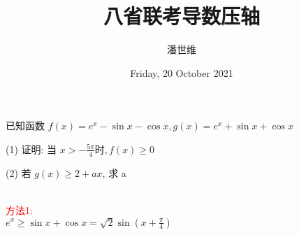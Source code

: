 \documentclass[a4paper,12pt]{article}
\begin{document}
\title {八省联考导数压轴}
\author{潘世维}
\date{Friday, 20 October 2021}
\maketitle

已知函数 $ f(x)=e^{x}-\sin x-\cos x, g(x)=e^{x}+\sin x+\cos x$


(1) 证明: 当 $ x>-\frac{5 \pi}{4}  时,  f(x) \geq 0 $



(2) 若 $ g(x) \geq 2+a x $, 求  a 
\begin{flushleft}
~\\
\textcolor{red}{方法1:}\\
$e^x \geqslant \sin x + \cos x = \sqrt 2 \sin \left( x + \frac{\pi }{4} \right) $


\end{flushleft}
\end{document}
